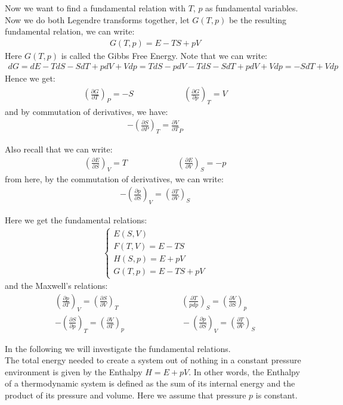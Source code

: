\documentclass[11pt]{article}
\theoremstyle{break}
\theoremstyle{break}
\newcommand{\pd}{\partial}
\newcommand{\lr}[1]{\left( #1 \right)}
\begin{document}
Now we want to find a fundamental relation with $T$, $p$ as fundamental variables. Now we do both Legendre transforms together, let $G(T,p)$ be the resulting fundamental relation, we can write:
\begin{align*}
G(T,p) = E-TS+pV
\end{align*}
Here $G(T,p)$ is called the Gibbs Free Energy. Note that we can write:
\begin{align*}
dG = dE - TdS - SdT + pdV+Vdp = TdS-pdV-TdS-SdT+pdV+Vdp = -SdT + Vdp
\end{align*}
Hence we get:
\begin{align*}
\lr{\frac{\pd G}{\pd T}}_P = -S \qquad\qquad\qquad \lr{\frac{\pd G}{\pd p}}_T = V
\end{align*}
and by commutation of derivatives, we have:
\begin{align*}
-\lr{\frac{\pd S}{\pd P}}_T = \frac{\pd V}{\pd T}_P
\end{align*}

Also recall that we can write:
\begin{align*}
\lr{\frac{\pd E}{\pd S}}_V = T \qquad\qquad\qquad \lr{\frac{\pd E}{\pd V}}_S = -p
\end{align*}
from here, by the commutation of derivatives, we can write:
\begin{align*}
-\lr{\frac{\pd p}{\pd S}}_V = \lr{\frac{\pd T}{\pd V}}_S
\end{align*}

Here we get the fundamental relations:
\begin{align*}
\begin{cases}
E(S,V) \\
F(T,V) =E-TS\\
H(S,p) =E+pV\\
G(T,p) =E-TS+pV
\end{cases}
\end{align*}
and the Maxwell's relations:
\begin{align*}
\lr{\frac{\pd p}{\pd T}}_V = \lr{\frac{\pd S}{\pd V}}_T \qquad&\qquad \qquad \lr{\frac{\pd T}{pd p}}_S = \lr{\frac{\pd V}{\pd S}}_p \\
-\lr{\frac{\pd S}{\pd p}}_T = \lr{\frac{\pd V}{\pd T}}_p\qquad&\qquad\qquad
-\lr{\frac{\pd p}{\pd S}}_V = \lr{\frac{\pd T}{\pd V}}_S
\end{align*}


In the following we will investigate the fundamental relations.\\

The total energy needed to create a system out of nothing in a constant pressure environment is given by the Enthalpy $H = E+pV$. In other words, the Enthalpy of a thermodynamic system is defined as the sum of its internal energy and the product of its pressure and volume. Here we assume that pressure $p$ is constant.\\
\end{document}
